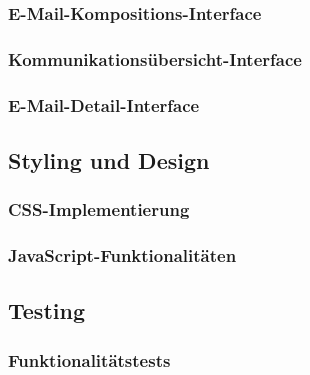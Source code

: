 \documentclass[11pt,a4paper]{article}
\begin{document}
\subsubsection{E-Mail-Kompositions-Interface}

\subsubsection{Kommunikationsübersicht-Interface}


\subsubsection{E-Mail-Detail-Interface}


\subsection{Styling und Design}

\subsubsection{CSS-Implementierung}

\subsubsection{JavaScript-Funktionalitäten}

\subsection{Testing}

\subsubsection{Funktionalitätstests}
\end{document}
